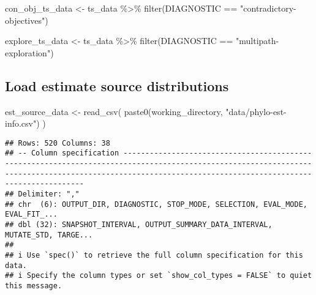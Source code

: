 \documentclass[
]{book}
\newenvironment{Shaded}{\begin{snugshade}}{\end{snugshade}}
\newcommand{\FunctionTok}[1]{\textcolor[rgb]{0.00,0.00,0.00}{#1}}
\newcommand{\NormalTok}[1]{#1}
\newcommand{\OtherTok}[1]{\textcolor[rgb]{0.56,0.35,0.01}{#1}}
\newcommand{\SpecialCharTok}[1]{\textcolor[rgb]{0.00,0.00,0.00}{#1}}
\newcommand{\StringTok}[1]{\textcolor[rgb]{0.31,0.60,0.02}{#1}}
\begin{document}
\begin{Shaded}
\begin{Highlighting}[]
\NormalTok{con\_obj\_ts\_data }\OtherTok{\textless{}{-}}\NormalTok{ ts\_data }\SpecialCharTok{\%\textgreater{}\%}
  \FunctionTok{filter}\NormalTok{(DIAGNOSTIC }\SpecialCharTok{==} \StringTok{"contradictory{-}objectives"}\NormalTok{)}

\NormalTok{explore\_ts\_data }\OtherTok{\textless{}{-}}\NormalTok{ ts\_data }\SpecialCharTok{\%\textgreater{}\%}
  \FunctionTok{filter}\NormalTok{(DIAGNOSTIC }\SpecialCharTok{==} \StringTok{"multipath{-}exploration"}\NormalTok{)}
\end{Highlighting}
\end{Shaded}

\hypertarget{load-estimate-source-distributions}{%
\subsection{Load estimate source distributions}\label{load-estimate-source-distributions}}

\begin{Shaded}
\begin{Highlighting}[]
\NormalTok{est\_source\_data }\OtherTok{\textless{}{-}} \FunctionTok{read\_csv}\NormalTok{(}
  \FunctionTok{paste0}\NormalTok{(working\_directory, }\StringTok{"data/phylo{-}est{-}info.csv"}\NormalTok{)}
\NormalTok{)}
\end{Highlighting}
\end{Shaded}

\begin{verbatim}
## Rows: 520 Columns: 38
## -- Column specification ---------------------------------------------------------------------------------------------------------------------------------------------------------------------------------------------------------
## Delimiter: ","
## chr  (6): OUTPUT_DIR, DIAGNOSTIC, STOP_MODE, SELECTION, EVAL_MODE, EVAL_FIT_...
## dbl (32): SNAPSHOT_INTERVAL, OUTPUT_SUMMARY_DATA_INTERVAL, MUTATE_STD, TARGE...
## 
## i Use `spec()` to retrieve the full column specification for this data.
## i Specify the column types or set `show_col_types = FALSE` to quiet this message.
\end{verbatim}
\end{document}
